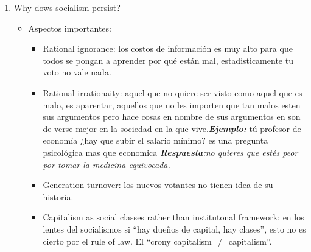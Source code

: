 \begin{enumerate}
    
    \item Why dows socialism persist?
    \begin{itemize}
        \item Aspectos importantes:
        \begin{itemize}
            \item Rational ignorance: los costos de información es muy alto para que todos se pongan a aprender por qué están mal, estadisticamente tu voto no vale nada.
            \item Rational irrationaity: aquel que no quiere ser visto como aquel que es malo, es aparentar, aquellos que no les importen que tan malos esten sus argumentos pero hace cosas en nombre de sus argumentos en son de verse mejor en la sociedad en la que vive.\textbf{\emph{Ejemplo:}} tú profesor de economía ¿hay que subir el salario mínimo? es una pregunta psicológica mas que economica \emph{\textbf{Respuesta}:no quieres que estés peor por tomar la medicina equivocada.}
            \item Generation turnover: los nuevos votantes no tienen idea de su historia.
            \item Capitalism as social classes rather than institutonal framework: en los lentes del socialismos si ``hay dueños de capital, hay clases'', esto no es cierto por el rule of law. \newline  El ``crony capitalism $\neq$ capitalism''.
        \end{itemize}
    \end{itemize}


\end{enumerate}

